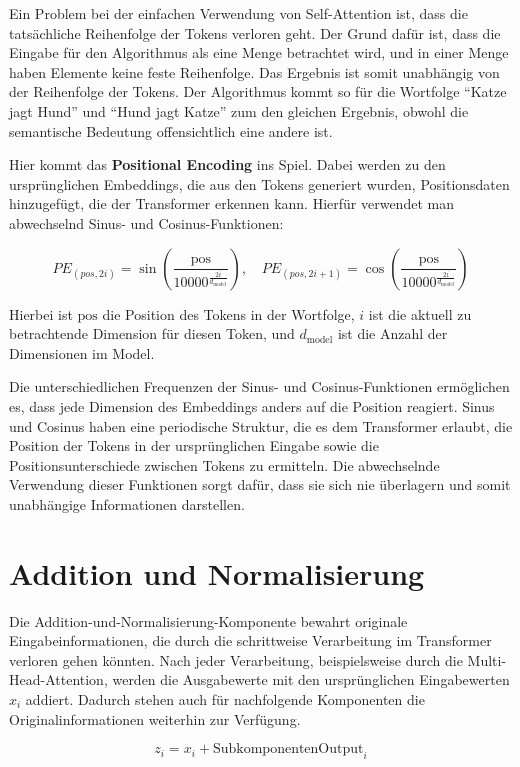Ein Problem bei der einfachen Verwendung von Self-Attention ist, dass die tatsächliche Reihenfolge der Tokens verloren geht.  
Der Grund dafür ist, dass die Eingabe für den Algorithmus als eine Menge betrachtet wird, und in einer Menge haben Elemente keine feste Reihenfolge.  
Das Ergebnis ist somit unabhängig von der Reihenfolge der Tokens.
Der Algorithmus kommt so für die Wortfolge \enquote{Katze jagt Hund} und \enquote{Hund jagt Katze} zum den gleichen Ergebnis, obwohl die semantische Bedeutung offensichtlich eine andere ist. 

Hier kommt das \textbf{Positional Encoding} ins Spiel.  
Dabei werden zu den ursprünglichen Embeddings, die aus den Tokens generiert wurden, Positionsdaten hinzugefügt, die der Transformer erkennen kann.  
Hierfür verwendet man abwechselnd Sinus- und Cosinus-Funktionen:

\[
PE_{(pos, 2i)} = \sin\left(\frac{\text{pos}}{10000^{\frac{2i}{d_{\text{model}}}}}\right), \quad
PE_{(pos, 2i+1)} = \cos\left(\frac{\text{pos}}{10000^{\frac{2i}{d_{\text{model}}}}}\right)
\]

Hierbei ist \( \text{pos} \) die Position des Tokens in der Wortfolge, \( i \) ist die aktuell zu betrachtende Dimension für diesen Token, und \( d_{\text{model}} \) ist die Anzahl der Dimensionen im Model.

Die unterschiedlichen Frequenzen der Sinus- und Cosinus-Funktionen ermöglichen es, dass jede Dimension des Embeddings anders auf die Position reagiert.  
Sinus und Cosinus haben eine periodische Struktur, die es dem Transformer erlaubt, die Position der Tokens in der ursprünglichen Eingabe sowie die Positionsunterschiede zwischen Tokens zu ermitteln.  
Die abwechselnde Verwendung dieser Funktionen sorgt dafür, dass sie sich nie überlagern und somit unabhängige Informationen darstellen.

\section{Addition und Normalisierung}

Die Addition-und-Normalisierung-Komponente bewahrt originale Eingabeinformationen, die durch die schrittweise Verarbeitung im Transformer verloren gehen könnten. 
Nach jeder Verarbeitung, beispielsweise durch die Multi-Head-Attention, werden die Ausgabewerte mit den ursprünglichen Eingabewerten \( x_i \) addiert. 
Dadurch stehen auch für nachfolgende Komponenten die Originalinformationen weiterhin zur Verfügung.

\[
z_i = x_i + \text{SubkomponentenOutput}_i
\]

